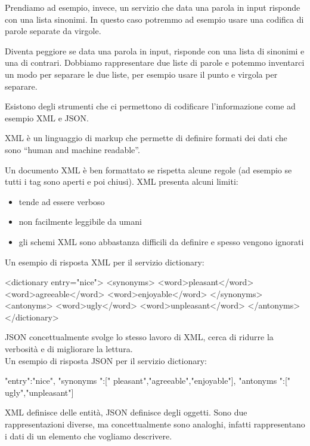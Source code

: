 Prendiamo ad esempio, invece, un servizio che data una parola in input risponde con una lista sinonimi. 
In questo caso potremmo ad esempio usare una codifica di parole separate da virgole. 

Diventa peggiore se data una parola in input, risponde con una lista di sinonimi e una di contrari.
Dobbiamo rappresentare due liste di parole e potemmo inventarci un modo per separare le due liste, per esempio usare il punto e virgola per separare.

Esistono degli strumenti che ci permettono di codificare l'informazione come ad esempio XML e JSON.

XML è un linguaggio di markup che permette di definire formati dei dati che sono “human and machine readable”. 

Un documento XML è ben formattato se rispetta alcune regole (ad esempio se tutti i tag sono aperti e poi chiusi). 
XML presenta alcuni limiti:
\begin{itemize}
    \item tende ad essere verboso 
    \item non facilmente leggibile da umani
    \item gli schemi XML sono abbastanza difficili da definire e spesso vengono ignorati
\end{itemize}

Un esempio di risposta XML per il servizio dictionary:
\begin{XML}
    <dictionary entry="nice">
        <synonyms>
            <word>pleasant</word>
            <word>agreeable</word>
            <word>enjoyable</word>
        </synonyms>
        <antonyms>
            <word>ugly</word>
            <word>unpleasant</word>
        </antonyms>
    </dictionary>
\end{XML}

JSON concettualmente svolge lo stesso lavoro di XML, cerca di ridurre la verbosità e di migliorare la lettura. 
\\ Un esempio di risposta JSON per il servizio dictionary:
\begin{JSON}
    {
        "entry":"nice",
        "synonyms ":[" pleasant","agreeable","enjoyable"],
        "antonyms ":[" ugly","unpleasant"]
    }
\end{JSON}    

XML definisce delle entità, JSON definisce degli oggetti. 
Sono due rappresentazioni diverse, ma concettualmente sono analoghi, infatti rappresentano i dati di un elemento che vogliamo descrivere.

